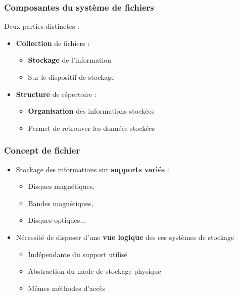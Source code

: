 \begin{frame}
\frametitle{Composantes du système de fichiers}
Deux parties distinctes :
\begin{itemize}
\item \textbf{Collection} de fichiers :
\begin{itemize}
\item \textbf{Stockage} de l'information
\item Sur le dispositif de stockage
\end{itemize}
\item \textbf{Structure} de répertoire :
\begin{itemize}
\item \textbf{Organisation} des informations stockées
\item Permet de retrouver les données stockées
\end{itemize}
\end{itemize}
\end{frame}


\begin{frame}
\frametitle{Concept de fichier}
\begin{itemize}
\item Stockage des informations sur \textbf{supports variés} :
\begin{itemize}
\item Disques magnétiques,
\item Bandes magnétiques,
\item Disques optiques...
\end{itemize}
\item Nécessité de disposer d'une \textbf{vue logique} des ces systèmes de stockage
\begin{itemize}
\item Indépendante du support utilisé
\item Abstraction du mode de stockage physique
\item Mêmes méthodes d'accès
\end{itemize}
\end{itemize}
\end{frame}

